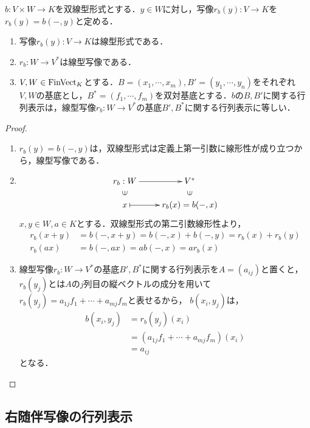 \documentclass[uplatex,dvipdfmx]{jsreport}
\begin{document}
\begin{proposition}[双線型形式の行列表示の特徴付け]\label{prop-characterization-of-matrix-representation-of-bilinar-form}
    $b:V\times W\to K$を双線型形式とする．$y\in W$に対し，写像$r_b(y):V\to K$を$r_b(y)=b(-,y)$と定める．
    \begin{enumerate}
        \item 写像$r_b(y):V\to K$は線型形式である．
        \item $r_b:W\to V^*$は線型写像である．
        \item $V,W\in\mathrm{FinVect}_K$とする．$B=(x_1,\cdots,x_m),B'=(y_1,\cdots,y_n)$をそれぞれ$V,W$の基底とし，$B^*=(f_1,\cdots,f_m)$を双対基底とする．$b$の$B,B'$に関する行列表示は，線型写像$r_b:W\to V^*$の基底$B',B^*$に関する行列表示に等しい．
    \end{enumerate}
\end{proposition}
\begin{proof}\mbox{}
    \begin{enumerate}
        \item $r_b(y)=b(-,y)$は，双線型形式は定義上第一引数に線形性が成り立つから，線型写像である．
        \item \[\xymatrix@R-2pc{
            r_b:W\ar[r]&V^*\\
            \rotatebox[origin=c]{90}{$\in$}&\rotatebox[origin=c]{90}{$\in$}\\
            x\ar@{|->}[r]&r_b(x)=b(-,x)
        }\]
        $x,y\in W,a\in K$とする．双線型形式の第二引数線形性より，
        \begin{align*}
            r_b(x+y)&=b(-,x+y)=b(-,x)+b(-,y)=r_b(x)+r_b(y)\\
            r_b(ax)&=b(-,ax)=ab(-,x)=ar_b(x)
        \end{align*}
        \item 線型写像$r_b:W\to V^*$の基底$B',B^*$に関する行列表示を$A=(a_{ij})$と置くと，$r_b(y_j)$とは$A$の$j$列目の縦ベクトルの成分を用いて$r_b(y_j)=a_{1j}f_1+\cdots+a_{mj}f_m$と表せるから，
        $b(x_i,y_j)$は，
        \begin{align*}
            b(x_i,y_j)&=r_b(y_j)(x_i)\\
            &=(a_{1j}f_1+\cdots+a_{mj}f_m)(x_i)\\
            &=a_{ij}
        \end{align*}
        となる．
    \end{enumerate}
\end{proof}

\subsection{右随伴写像の行列表示}
\end{document}
